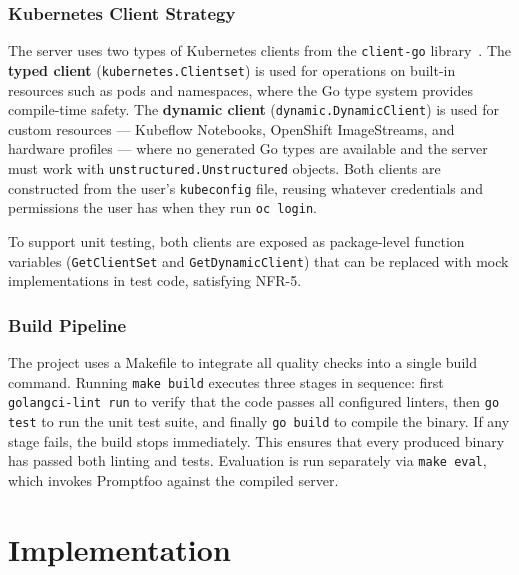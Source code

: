 \documentclass[
  digital,     %
  oneside,     %
  nosansbold,  %
  nocolorbold, %
  lof,         %
  lot,         %
]{fithesis4}
\begin{document}
\subsection{Kubernetes Client Strategy}
\label{subsec:client-strategy}

The server uses two types of Kubernetes clients from the
\texttt{client-go} library~\parencite{client-go}. The \textbf{typed client}
(\texttt{kubernetes.Clientset}) is used for operations on built-in
resources such as pods and namespaces, where the Go type system provides
compile-time safety. The \textbf{dynamic client}
(\texttt{dynamic.DynamicClient}) is used for custom resources --- Kubeflow
Notebooks, OpenShift ImageStreams, and hardware profiles --- where no
generated Go types are available and the server must work with
\texttt{unstructured.Unstructured} objects. Both clients are constructed from
the user's \texttt{kubeconfig} file, reusing whatever credentials and
permissions the user has when they run \texttt{oc login}.

To support unit testing, both clients are exposed as package-level function
variables (\texttt{GetClientSet} and \texttt{GetDynamicClient}) that can be
replaced with mock implementations in test code, satisfying NFR-5.

\subsection{Build Pipeline}
\label{subsec:build-pipeline}

The project uses a Makefile to integrate all quality checks into a single
build command. Running \texttt{make build} executes three stages in
sequence: first \texttt{golangci-lint run} to verify that the code passes
all configured linters, then \texttt{go test} to run the unit test suite,
and finally \texttt{go build} to compile the binary. If any stage fails,
the build stops immediately. This ensures that every produced binary has
passed both linting and tests. Evaluation is run separately via
\texttt{make eval}, which invokes Promptfoo against the compiled server.

\chapter{Implementation}
\label{chap:implementation}
\end{document}
